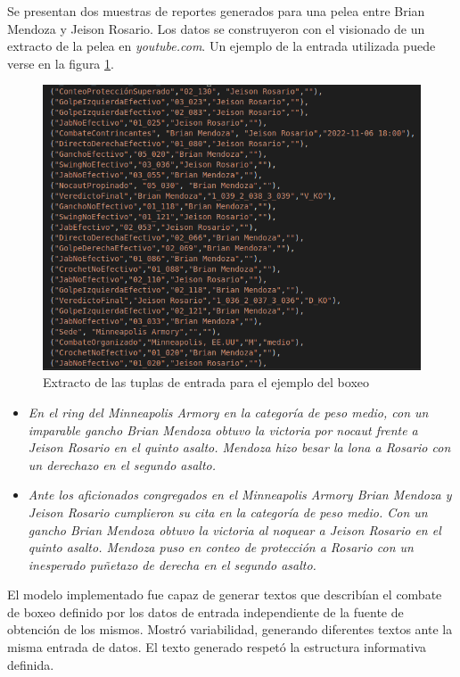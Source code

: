     Se presentan dos muestras de reportes generados para una pelea entre Brian Mendoza y Jeison Rosario. Los datos se construyeron con el 
visionado de un extracto de la pelea en \textit{youtube.com}. Un ejemplo de la entrada utilizada puede verse en la figura \ref{fig_entradaboxeo}.

    \begin{figure}[!]
        \begin{center}
            \includegraphics[scale=0.4]{Graphics/entradaboxeo.png}
        \end{center}
        \caption{Extracto de las tuplas de entrada para el ejemplo del boxeo}
        \label{fig_entradaboxeo}
    \end{figure}

    \begin{itemize}
        \item \textit{En el ring del Minneapolis Armory en la categoría de peso medio, con un imparable gancho Brian Mendoza obtuvo la victoria por nocaut frente 
        a Jeison Rosario en el quinto asalto.
        Mendoza hizo besar la lona a Rosario con un derechazo en el segundo asalto.}
        \item \textit{Ante los aficionados congregados en el Minneapolis Armory Brian Mendoza y Jeison Rosario cumplieron su cita en la categoría 
        de peso medio. Con un gancho Brian Mendoza obtuvo la victoria al noquear a Jeison Rosario en el quinto asalto.
        Mendoza puso en conteo de protección a Rosario con un inesperado puñetazo de derecha en el segundo asalto.}
    \end{itemize}

El modelo implementado fue capaz de generar textos que describían el combate de boxeo definido por los datos de entrada independiente de la fuente de obtención de los mismos. 
Mostró variabilidad, generando diferentes textos ante la misma entrada de datos. El texto generado respetó la estructura informativa definida.